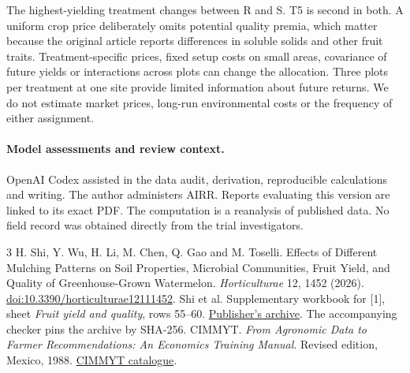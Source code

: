 \documentclass[11pt]{article}
\begin{document}
The highest-yielding treatment changes between R and S. T5 is second in both. A uniform crop price deliberately omits potential quality premia, which matter because the original article reports differences in soluble solids and other fruit traits. Treatment-specific prices, fixed setup costs on small areas, covariance of future yields or interactions across plots can change the allocation. Three plots per treatment at one site provide limited information about future returns. We do not estimate market prices, long-run environmental costs or the frequency of either assignment.

\paragraph{Model assessments and review context.} OpenAI Codex assisted in the data audit, derivation, reproducible calculations and writing. The author administers AIRR. Reports evaluating this version are linked to its exact PDF. The computation is a reanalysis of published data. No field record was obtained directly from the trial investigators.

\begin{thebibliography}{3}
 H. Shi, Y. Wu, H. Li, M. Chen, Q. Gao and M. Toselli. Effects of Different Mulching Patterns on Soil Properties, Microbial Communities, Fruit Yield, and Quality of Greenhouse-Grown Watermelon. \emph{Horticulturae} 12, 1452 (2026). \href{https://doi.org/10.3390/horticulturae12111452}{doi:10.3390/horticulturae12111452}.
 Shi et al. Supplementary workbook for [1], sheet \emph{Fruit yield and quality}, rows 55--60. \href{https://mdpi-res.com/d_attachment/horticulturae/horticulturae-12-01452/article_deploy/horticulturae-12-01452-s001.zip}{Publisher's archive}. The accompanying checker pins the archive by SHA-256.
 CIMMYT. \emph{From Agronomic Data to Farmer Recommendations: An Economics Training Manual}. Revised edition, Mexico, 1988. \href{https://knowledgecenter.cimmyt.org/bib/46420}{CIMMYT catalogue}.
\end{thebibliography}
\end{document}
